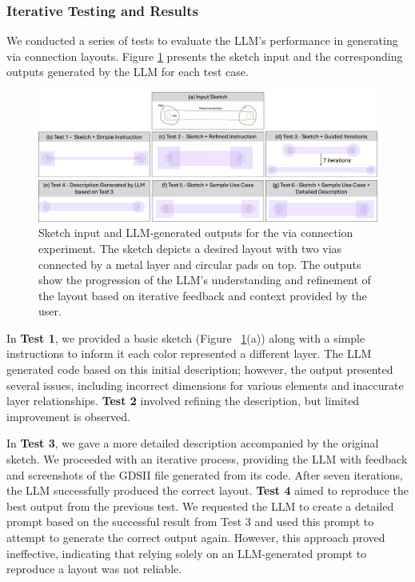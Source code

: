 \documentclass{article}
\begin{document}
\subsubsection{Iterative Testing and Results}
We conducted a series of tests to evaluate the LLM's performance in generating via connection layouts. Figure \ref{fig:via_experiment} presents the sketch input and the corresponding outputs generated by the LLM for each test case.
\begin{figure}[!h]
\centering
\includegraphics[width=1\linewidth]{Styles/Figure1_v3.png}
\caption{Sketch input and LLM-generated outputs for the via connection experiment. The sketch depicts a desired layout with two vias connected by a metal layer and circular pads on top. The outputs show the progression of the LLM's understanding and refinement of the layout based on iterative feedback and context provided by the user.}
\label{fig:via_experiment}
\end{figure}
In \textbf{Test 1}, we provided a basic sketch (Figure ~\ref{fig:via_experiment}(a)) along with a simple instructions to inform it each color represented a different layer. The LLM generated code based on this initial description; however, the output presented several issues, including incorrect dimensions for various elements and inaccurate layer relationships. \textbf{Test 2} involved refining the description, but limited improvement is observed. 

In \textbf{Test 3}, we gave a more detailed description accompanied by the original sketch. We proceeded with an iterative process, providing the LLM with feedback and screenshots of the GDSII file generated from its code. After seven iterations, the LLM successfully produced the correct layout. \textbf{Test 4} aimed to reproduce the best output from the previous test. We requested the LLM to create a detailed prompt based on the successful result from Test 3 and used this prompt to attempt to generate the correct output again. However, this approach proved ineffective, indicating that relying solely on an LLM-generated prompt to reproduce a layout was not reliable.
\end{document}
